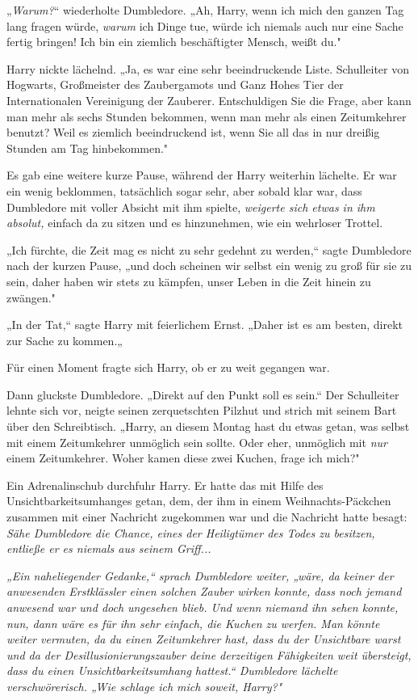 {„\emph{Warum?}“ wiederholte Dumbledore. „Ah, Harry, wenn ich mich den ganzen Tag lang fragen würde, \emph{warum} ich Dinge tue, würde ich niemals auch nur eine Sache fertig bringen! Ich bin ein ziemlich beschäftigter Mensch, weißt du."

Harry nickte lächelnd. „Ja, es war eine sehr beeindruckende Liste. Schulleiter von Hogwarts, Großmeister des Zaubergamots und Ganz Hohes Tier der Internationalen Vereinigung der Zauberer. Entschuldigen Sie die Frage, aber kann man mehr als sechs Stunden bekommen, wenn man mehr als einen Zeitumkehrer benutzt? Weil es ziemlich beeindruckend ist, wenn Sie all das in nur dreißig Stunden am Tag hinbekommen."

Es gab eine weitere kurze Pause, während der Harry weiterhin lächelte. Er war ein wenig beklommen, tatsächlich sogar sehr, aber sobald klar war, dass Dumbledore mit voller Absicht mit ihm spielte, \emph{weigerte sich etwas in ihm absolut,} einfach da zu sitzen und es hinzunehmen, wie ein wehrloser Trottel.

„Ich fürchte, die Zeit mag es nicht zu sehr gedehnt zu werden,“ sagte Dumbledore nach der kurzen Pause, „und doch scheinen wir selbst ein wenig zu groß für sie zu sein, daher haben wir stets zu kämpfen, unser Leben in die Zeit hinein zu zwängen."

„In der Tat,“ sagte Harry mit feierlichem Ernst. „Daher ist es am besten, direkt zur Sache zu kommen.„

Für einen Moment fragte sich Harry, ob er zu weit gegangen war.

Dann gluckste Dumbledore. „Direkt auf den Punkt soll es sein.“ Der Schulleiter lehnte sich vor, neigte seinen zerquetschten Pilzhut und strich mit seinem Bart über den Schreibtisch. „Harry, an diesem Montag hast du etwas getan, was selbst mit einem Zeitumkehrer unmöglich sein sollte. Oder eher, unmöglich mit \emph{nur} einem Zeitumkehrer. Woher kamen diese zwei Kuchen, frage ich mich?"

Ein Adrenalinschub durchfuhr Harry. Er hatte das mit Hilfe des Unsichtbarkeitsumhanges getan, dem, der ihm in einem Weihnachts-Päckchen zusammen mit einer Nachricht zugekommen war und die Nachricht hatte besagt: \emph{Sähe Dumbledore die Chance, eines der Heiligtümer des Todes zu besitzen, entließe er es niemals aus seinem Griff...}

\emph{„Ein naheliegender Gedanke,“ sprach Dumbledore weiter, „wäre, da keiner der anwesenden Erstklässler einen solchen Zauber wirken konnte, dass noch jemand anwesend war und doch ungesehen blieb. Und wenn niemand ihn sehen konnte, nun, dann wäre es für ihn sehr einfach, die Kuchen zu werfen. Man könnte weiter vermuten, da du einen Zeitumkehrer hast, dass du der Unsichtbare warst und da der Desillusionierungszauber deine derzeitigen Fähigkeiten weit übersteigt, dass du einen Unsichtbarkeitsumhang hattest.“ Dumbledore lächelte verschwörerisch. „Wie schlage ich mich soweit, Harry?"}

}
